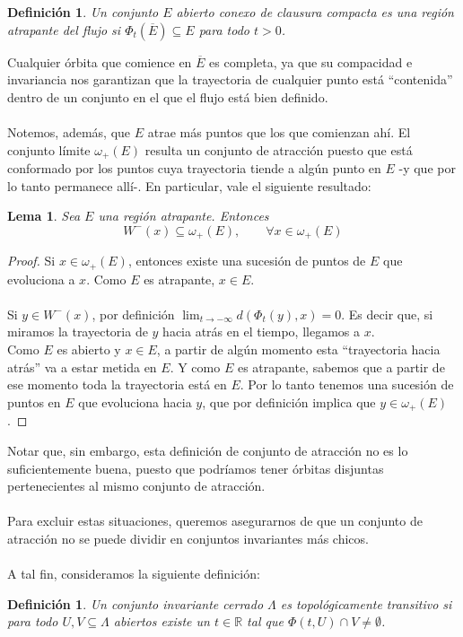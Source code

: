 \documentclass[12pt,a4paper]{article}
\newtheorem{lemma}[theorem]{Lema}
\newtheorem{definition}[theorem]{Definición}
\begin{document}
\begin{definition}
    Un conjunto $E$ abierto conexo de clausura compacta es una región atrapante del flujo si $\Phi_t(\overline{E}) \subseteq E$ para todo $t > 0$.
\end{definition}
Cualquier órbita que comience en $\overline{E}$ es completa, ya que su compacidad e invariancia nos garantizan que la trayectoria de cualquier punto está ``contenida'' dentro de un conjunto en el que el flujo está bien definido.
\\
\\
Notemos, además, que $E$ atrae más puntos que los que comienzan ahí. El conjunto límite $\omega_+(E)$ resulta un conjunto de atracción puesto que está conformado por los puntos cuya trayectoria tiende a algún punto en $E$ -y que por lo tanto permanece allí-. En particular, vale el siguiente resultado:
\begin{lemma}
    Sea $E$ una región atrapante. Entonces
    \[
    W^-(x) \subseteq \omega_+(E), \qquad \forall x \in \omega_+(E)
    \]
\end{lemma}
\begin{proof}
    Si $x \in \omega_+(E)$, entonces existe una sucesión de puntos de $E$ que evoluciona a $x$. Como $E$ es atrapante, $x \in E$.
    \\
    \\
    Si $y \in W^-(x)$, por definición $\displaystyle \lim_{t \rightarrow -\infty} d(\Phi_t(y), x) = 0$. Es decir que, si miramos la trayectoria de $y$ hacia atrás en el tiempo, llegamos a $x$.
    \\
    Como $E$ es abierto y $x \in E$, a partir de algún momento esta ``trayectoria hacia atrás'' va a estar metida en $E$. Y como $E$ es atrapante, sabemos que a partir de ese momento toda la trayectoria está en $E$. Por lo tanto tenemos una sucesión de puntos en $E$ que evoluciona hacia $y$, que por definición implica que $y \in \omega_+(E)$.
\end{proof}
Notar que, sin embargo, esta definición de conjunto de atracción no es lo suficientemente buena, puesto que podríamos tener órbitas disjuntas pertenecientes al mismo conjunto de atracción.
\\
\\
Para excluir estas situaciones, queremos asegurarnos de que un conjunto de atracción no se puede dividir en conjuntos invariantes más chicos.
\\
\\
A tal fin, consideramos la siguiente definición:
\begin{definition}
    Un conjunto invariante cerrado $\Lambda$ es \textit{topológicamente transitivo} si para todo $U, V \subseteq \Lambda$ abiertos existe un $t \in \mathbb{R}$ tal que $\Phi(t,U) \cap V \neq \emptyset$.
\end{definition}
\end{document}
